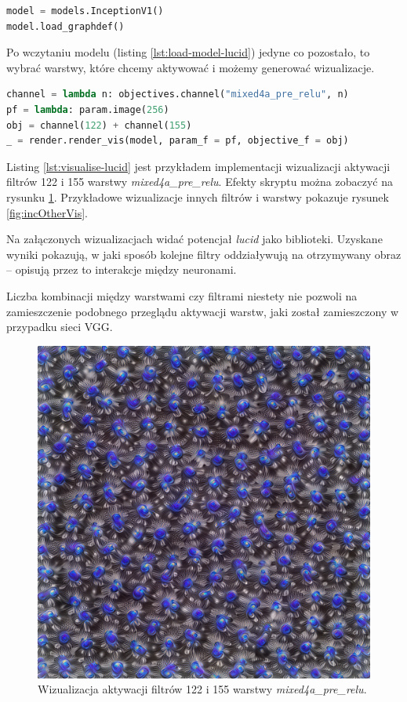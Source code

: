 \begin{lstlisting}[language=Python, caption={Wczytywanie modelu GoogleLeNet w \textit{lucid}.}, label={lst:load-model-lucid}, captionpos=b]
model = models.InceptionV1()
model.load_graphdef()
\end{lstlisting}

Po wczytaniu modelu (listing \ref{lst:load-model-lucid}) jedyne co pozostało, to wybrać warstwy, które chcemy aktywować i możemy generować wizualizacje.

\begin{lstlisting}[language=Python, caption={Generowanie wizualizacji neuronów przy użyciu \textit{lucid}.}, label={lst:visualise-lucid}, captionpos=b]
channel = lambda n: objectives.channel("mixed4a_pre_relu", n)
pf = lambda: param.image(256)
obj = channel(122) + channel(155)
_ = render.render_vis(model, param_f = pf, objective_f = obj)
\end{lstlisting}

Listing \ref{lst:visualise-lucid} jest przykładem implementacji wizualizacji aktywacji filtrów 122 i 155 warstwy \textit{mixed4a\_pre\_relu}.
Efekty skryptu można zobaczyć na rysunku \ref{fig:inc122i155}. Przykładowe wizualizacje innych filtrów i warstwy pokazuje rysunek \ref{fig:incOtherVis}.

Na załączonych wizualizacjach widać potencjał \textit{lucid} jako biblioteki. Uzyskane wyniki pokazują, w jaki sposób kolejne filtry oddziaływują na otrzymywany obraz -- opisują przez to interakcje między neuronami.

Liczba kombinacji między warstwami czy filtrami niestety nie pozwoli na zamieszczenie podobnego przeglądu aktywacji warstw, jaki został zamieszczony w przypadku sieci VGG. 
\begin{figure}[ht]
\centerline{\includegraphics[scale=0.5]{resources/inception/mixed4a_pre_relu_122i155.png}}
\caption{Wizualizacja aktywacji filtrów 122 i 155 warstwy \textit{mixed4a\_pre\_relu}.}
\label{fig:inc122i155}
\end{figure}


